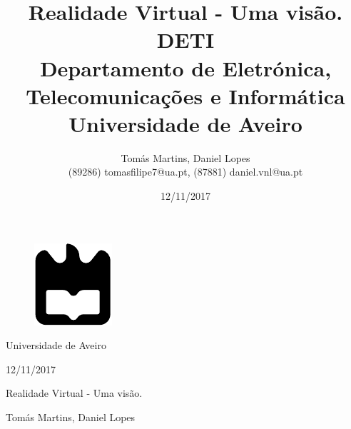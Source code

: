 \documentclass[hidelinks,11pt,twoside,a4paper]{report}
\begin{document}
\def\titulo{Realidade Virtual - Uma visão.}
\def\data{12/11/2017}
\def\autores{Tomás Martins, Daniel Lopes}
\def\autorescontactos{(89286) tomasfilipe7@ua.pt, (87881) daniel.vnl@ua.pt}
\def\departamentoacr{DETI}
\def\departamento{Departamento de Eletrónica, Telecomunicações e Informática}
\def\empresa{Universidade de Aveiro}
\def\logotipo{imagens/ua.pdf}



\begin{titlepage}

\begin{figure}[H]
\centering
\includegraphics[scale=1]{imagens/ua.pdf} 
\end{figure}

%
\centering
{\Large \empresa}
%

%
\vspace{5mm}
%
\centering
{\Large \data}


\begin{center}
%
\vspace*{50mm}
%
{\Huge \titulo}\\ 
%
\vspace{10mm}
%

%
\vspace{20mm}
%
{\LARGE \autores}\\ 
%
\vspace{30mm}
%
\begin{figure}[h]
\center

\end{figure}
%
\vspace{30mm}
\end{center}
%

\end{titlepage}


\title
{
{\Huge\textbf{\titulo}}\\
{\Large \departamentoacr\\ \departamento\\ \empresa}	
}
%
\author{%
    \autores \\
    \autorescontactos
}
%
\date{\data}
%
\maketitle
\begin{titlepage}\end{titlepage}
\end{document}
